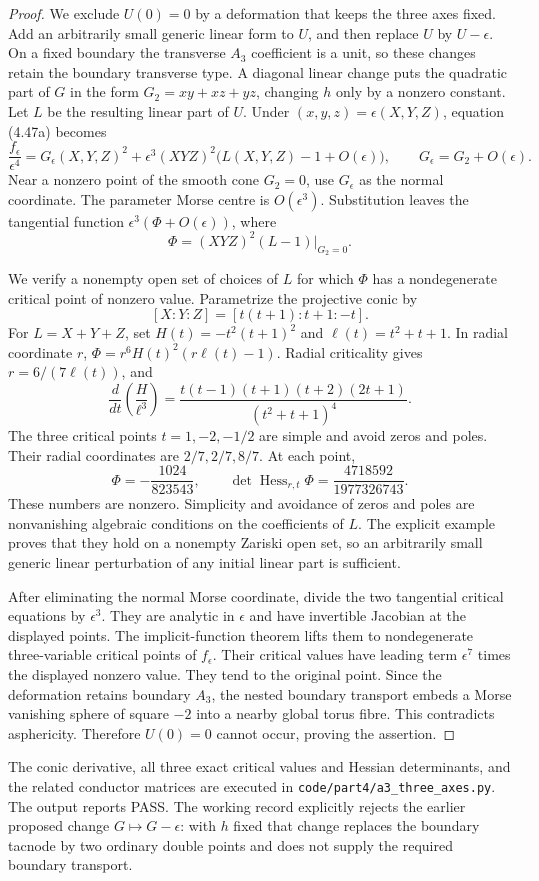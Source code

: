 \begin{proof}
We exclude $U(0)=0$ by a deformation that keeps the
three axes fixed. Add an arbitrarily small generic
linear form to $U$, and then replace $U$ by
$U-\epsilon$. On a fixed boundary the transverse
$A_3$ coefficient is a unit, so these changes retain
the boundary transverse type. A diagonal linear change
puts the quadratic part of $G$ in the form
$G_2=xy+xz+yz$, changing $h$ only by a nonzero constant.
Let $L$ be the resulting linear part of $U$.
Under $(x,y,z)=\epsilon(X,Y,Z)$, equation (4.47a) becomes
\[
 \frac{f_\epsilon}{\epsilon^4}
   =G_\epsilon(X,Y,Z)^2+\epsilon^3(XYZ)^2
                          \bigl(L(X,Y,Z)-1+O(\epsilon)\bigr),
 \qquad G_\epsilon=G_2+O(\epsilon).
\]
Near a nonzero point of the smooth cone $G_2=0$,
use $G_\epsilon$ as the normal coordinate. The
parameter Morse centre is $O(\epsilon^3)$.
Substitution leaves the tangential function
$\epsilon^3(\Phi+O(\epsilon))$, where
\[
                 \Phi=(XYZ)^2(L-1)|_{G_2=0}.
\]

We verify a nonempty open set of choices of $L$ for
which $\Phi$ has a nondegenerate critical point of
nonzero value. Parametrize the projective conic by
\[
              [X:Y:Z]=[t(t+1):t+1:-t].
\]
For $L=X+Y+Z$, set
$H(t)=-t^2(t+1)^2$ and $\ell(t)=t^2+t+1$.
In radial coordinate $r$,
$\Phi=r^6H(t)^2(r\ell(t)-1)$.
Radial criticality gives $r=6/(7\ell(t))$, and
\[
 \frac{d}{dt}\left(\frac{H}{\ell^3}\right)
  =\frac{t(t-1)(t+1)(t+2)(2t+1)}{(t^2+t+1)^4}.
\]
The three critical points $t=1,-2,-1/2$ are simple
and avoid zeros and poles. Their radial coordinates
are $2/7,2/7,8/7$. At each point,
\[
       \Phi=-\frac{1024}{823543},\qquad
       \det\operatorname{Hess}_{r,t}\Phi
                     =\frac{4718592}{1977326743}.
\]
These numbers are nonzero. Simplicity and avoidance
of zeros and poles are nonvanishing algebraic conditions
on the coefficients of $L$. The explicit example proves
that they hold on a nonempty Zariski open set, so an
arbitrarily small generic linear perturbation of any
initial linear part is sufficient.

After eliminating the normal Morse coordinate, divide
the two tangential critical equations by $\epsilon^3$.
They are analytic in $\epsilon$ and have invertible
Jacobian at the displayed points. The implicit-function
theorem lifts them to nondegenerate three-variable
critical points of $f_\epsilon$. Their critical values
have leading term $\epsilon^7$ times the displayed
nonzero value. They tend to the original point.
Since the deformation retains boundary $A_3$, the
nested boundary transport embeds a Morse vanishing
sphere of square $-2$ into a nearby global torus fibre.
This contradicts asphericity. Therefore $U(0)=0$
cannot occur, proving the assertion.
\end{proof}

The conic derivative, all three exact critical values
and Hessian determinants, and the related conductor
matrices are executed in
\texttt{code/part4/a3\_three\_axes.py}.
The output reports PASS. The working record explicitly
rejects the earlier proposed change $G\mapsto G-\epsilon$:
with $h$ fixed that change replaces the boundary tacnode
by two ordinary double points and does not supply the
required boundary transport.
